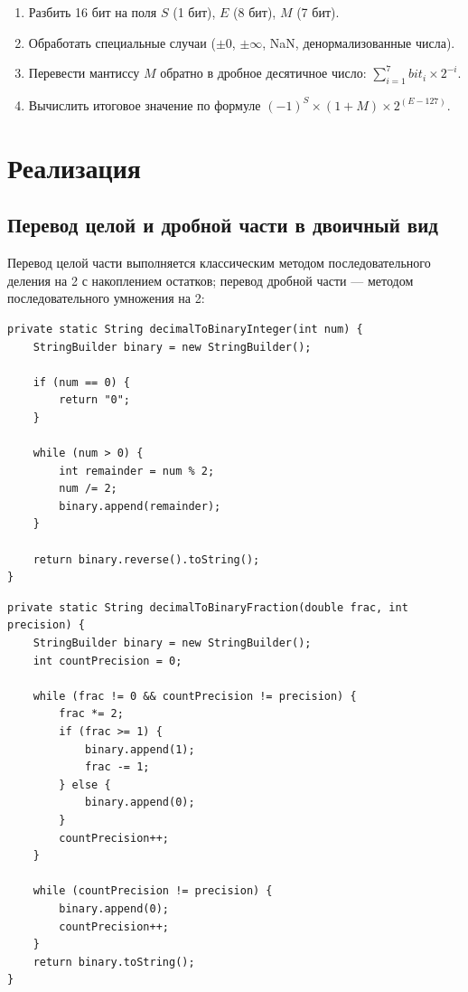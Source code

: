 \documentclass[12pt,a4paper]{article}
\begin{document}
\begin{enumerate}
    \item Разбить 16 бит на поля $S$ (1 бит), $E$ (8 бит), $M$ (7 бит).
    \item Обработать специальные случаи ($\pm 0$, $\pm\infty$, NaN,
    денормализованные числа).
    \item Перевести мантиссу $M$ обратно в дробное десятичное число:
    $\sum_{i=1}^{7} bit_i \times 2^{-i}$.
    \item Вычислить итоговое значение по формуле
    $(-1)^S \times (1 + M) \times 2^{(E - 127)}$.
\end{enumerate}

\section{Реализация}

\subsection{Перевод целой и дробной части в двоичный вид}

Перевод целой части выполняется классическим методом последовательного
деления на 2 с накоплением остатков; перевод дробной части — методом
последовательного умножения на 2:

\begin{lstlisting}[caption={Перевод целой части в двоичный вид}]
private static String decimalToBinaryInteger(int num) {
    StringBuilder binary = new StringBuilder();

    if (num == 0) {
        return "0";
    }

    while (num > 0) {
        int remainder = num % 2;
        num /= 2;
        binary.append(remainder);
    }

    return binary.reverse().toString();
}
\end{lstlisting}

\begin{lstlisting}[caption={Перевод дробной части в двоичный вид}]
private static String decimalToBinaryFraction(double frac, int precision) {
    StringBuilder binary = new StringBuilder();
    int countPrecision = 0;

    while (frac != 0 && countPrecision != precision) {
        frac *= 2;
        if (frac >= 1) {
            binary.append(1);
            frac -= 1;
        } else {
            binary.append(0);
        }
        countPrecision++;
    }

    while (countPrecision != precision) {
        binary.append(0);
        countPrecision++;
    }
    return binary.toString();
}
\end{lstlisting}
\end{document}
